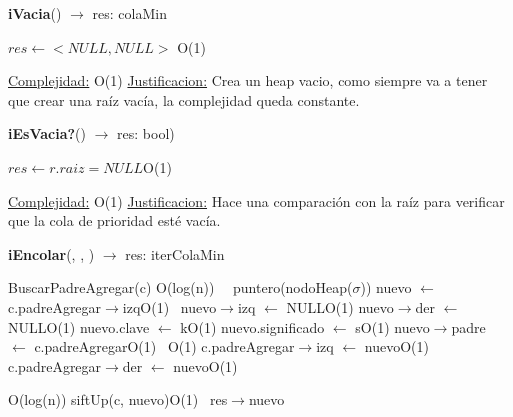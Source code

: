 \begin{Representacion}
\begin{Algoritmos}

\begin{algorithm}[H]{\textbf{iVacia}() $\to$ res: colaMin}
	\begin{algorithmic}[1]
		\State $res \gets <NULL, NULL>$ \Comment O(1)
		
		\medskip
		\Statex \underline{Complejidad:} O(1)
			\Statex \underline{Justificacion:} Crea un heap vacio, como siempre va a tener que crear una raíz vacía, la complejidad queda constante.
	\end{algorithmic}
\end{algorithm}


\begin{algorithm}[H]{\textbf{iEsVacia?}() $\to$ res: bool)}
	\begin{algorithmic}[1]
		\State $res \gets r.raiz = NULL$\Comment O(1)
		
		\medskip
		\Statex \underline{Complejidad:} O(1)
			\Statex \underline{Justificacion:} Hace una comparación con la raíz para verificar que la cola de prioridad esté vacía.
	\end{algorithmic}
\end{algorithm}

\begin{algorithm}[H]{\textbf{iEncolar}(, , ) $\to$ res: iterColaMin}
	\begin{algorithmic}[1]

		\State BuscarPadreAgregar(c) \Comment O(log(n))
		\,
		\ puntero(nodoHeap($\sigma$)) nuevo $\leftarrow$ c.padreAgregar$\rightarrow$izq\Comment O(1)
		\,
		\State nuevo$\rightarrow$izq $\leftarrow$ NULL\Comment O(1)
		\State nuevo$\rightarrow$der $\leftarrow$ NULL\Comment O(1)
		\State nuevo.clave $\leftarrow$ k\Comment O(1)
		\State nuevo.significado $\leftarrow$ s\Comment O(1)
		\State nuevo$\rightarrow$padre $\leftarrow$ c.padreAgregar\Comment O(1)
		\,	
		\Comment O(1)
			\State c.padreAgregar$\rightarrow$izq $\leftarrow$ nuevo\Comment O(1)
		\,
		\Else
			\State c.padreAgregar$\rightarrow$der $\leftarrow$ nuevo\Comment O(1)
		\EndIf
		\,
				
		\Comment O(log(n))
			\State siftUp(c, nuevo)\Comment O(1)
		\EndWhile			
		\,		
		\State res$\rightarrow$nuevo
		

\end{algorithmic}
\end{algorithm}
\end{Algoritmos}
\end{Representacion}
